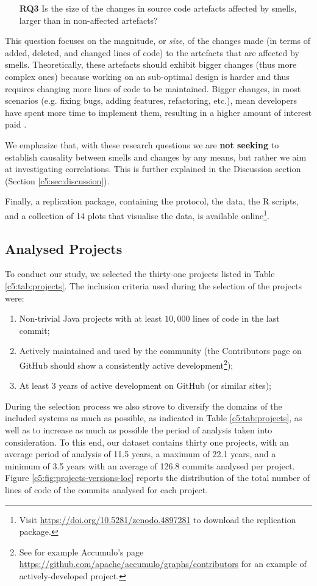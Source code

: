 \begin{itemize}
    \item[\textbf{RQ3}] Is the size of the changes in source code artefacts affected by smells, larger than in non-affected artefacts?
\end{itemize}
This question focuses on the magnitude, or \emph{size}, of the changes made (in terms of added, deleted, and changed lines of code) to the artefacts that are affected by smells. Theoretically, these artefacts should exhibit bigger changes (thus more complex ones) because working on an sub-optimal design is harder and thus requires changing more lines of code to be maintained.
Bigger changes, in most scenarios (e.g. fixing bugs, adding features, refactoring, etc.), mean developers have spent more time to implement them, resulting in a higher amount of interest paid \cite{ElEmam2000, Mockus2000}.

We emphasize that, with these research questions we are \textbf{not seeking} to establish causality between smells and changes by any means, but rather we aim at investigating correlations. This is further explained in the Discussion section (Section \ref{c5:sec:discussion}).

Finally, a replication package, containing the protocol, the data, the R scripts, and a collection of 14 plots that visualise the data, is available online\footnote{\label{ftn:repl-package}Visit \url{https://doi.org/10.5281/zenodo.4897281} to download the replication package.}.

\subsection{Analysed Projects}
To conduct our study, we selected the thirty-one projects listed in Table \ref{c5:tab:projects}. 
The inclusion criteria used during the selection of the projects were:
\begin{enumerate}
    \item Non-trivial Java projects with at least $10,000$ lines of code in the last commit; 
    \item Actively maintained and used by the community (the Contributors page on GitHub should show a consistently active development\footnote{See for example Accumulo's page \url{https://github.com/apache/accumulo/graphs/contributors} for an example of actively-developed project.});
    \item At least 3 years of active development on GitHub (or similar sites);
\end{enumerate}
During the selection process we also strove to diversify the domains of the included systems as much as possible, as indicated in Table \ref{c5:tab:projects}, as well as to increase as much as possible the period of analysis taken into consideration.
To this end, our dataset contains thirty one projects, with an average period of analysis of 11.5 years, a maximum of 22.1 years, and a minimum of 3.5 years with an average of 126.8 commits analysed per project.
Figure \ref{c5:fig:projects-versions-loc} reports the distribution of the total number of lines of code of the commits analysed for each project.

